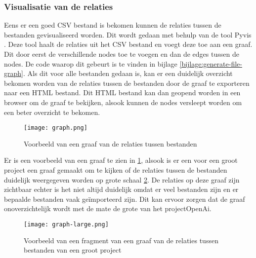 \subsubsection{Visualisatie van de relaties}
\label{subsec:project-documentatie-relaties-visualisatie}

Eens er een goed CSV bestand is bekomen kunnen de relaties tussen de bestanden gevisualiseerd worden.
Dit wordt gedaan met behulp van de tool Pyvis \autocite{WHIR2018}.
Deze tool haalt de relaties uit het CSV bestand en voegt deze toe aan een graaf. 
Dit door eerst de verschillende nodes toe te voegen en dan de edges tussen de nodes. 
De code waarop dit gebeurt is te vinden in bijlage \ref{bijlage:generate-file-graph}.
Als dit voor alle bestanden gedaan is, kan er een duidelijk overzicht bekomen worden van de relaties tussen de bestanden door de graaf te exporteren naar een HTML bestand.
Dit HTML bestand kan dan geopend worden in een browser om de graaf te bekijken, alsook kunnen de nodes versleept worden om een beter overzicht te bekomen.

\begin{figure}[h]
    \centering
    \texttt{[image: graph.png]}
    \caption{Voorbeeld van een graaf van de relaties tussen bestanden}
    \label{fig:graph}
\end{figure}

Er is een voorbeeld van een graaf te zien in \ref{fig:graph}, alsook is er een voor een groot project een graaf gemaakt om te kijken of de relaties tussen de bestanden duidelijk weergegeven worden op grote schaal \ref{fig:graph-large}.
De relaties op deze graaf zijn zichtbaar echter is het niet altijd duidelijk omdat er veel bestanden zijn en er bepaalde bestanden vaak geïmporteerd zijn.
Dit kan ervoor zorgen dat de graaf onoverzichtelijk wordt met de mate de grote van het projectOpenAi.

\begin{figure}[h]
    \centering
    \texttt{[image: graph-large.png]}
    \caption{Voorbeeld van een fragment van een graaf van de relaties tussen bestanden van een groot project}
    \label{fig:graph-large}
\end{figure}